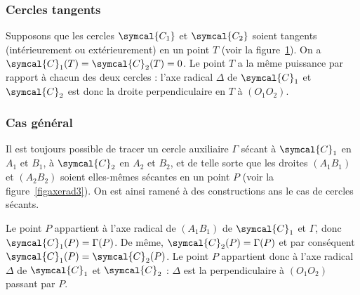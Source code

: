 \subsubsection{Cercles tangents}
Supposons que les cercles $\symcal{C_1}$ et $\symcal{C_2}$ soient tangents (intérieurement ou extérieurement) en un point $T$ (voir la figure~\ref{figaxerad2}). On a 
$\symcal{C}_1(T)=\symcal{C}_2(T)=0$.
Le point $T$ a la même puissance par rapport à chacun des deux cercles : l'axe radical $\Delta$ de $\symcal{C}_1$ et $\symcal{C}_2$ est donc la droite perpendiculaire en $T$ à $(O_1O_2)$.

\begin{figure}[ht]
\centering
{}
\figcaption{}\label{figaxerad2}
\end{figure}


\subsubsection{Cas général}
Il est toujours possible de tracer un cercle auxiliaire $\Gamma$ sécant à $\symcal{C}_1$ en $A_1$ et $B_1$, à $\symcal{C}_2$ en $A_2$ et $B_2$, et  de telle sorte que les droites $(A_1B_1)$ et $(A_2B_2)$ soient elles-mêmes sécantes en un point $P$ (voir la figure~\ref{figaxerad3}). On est ainsi ramené à des constructions ans le cas de cercles sécants.

Le point $P$ appartient à l'axe radical de $(A_1B_1)$ de $\symcal{C}_1$ et $\Gamma$, donc $\symcal{C}_1(P)=\Gamma(P)$. De même, $\symcal{C}_2(P)=\Gamma(P)$ et par conséquent $\symcal{C}_1(P)=\symcal{C}_2(P)$. Le point $P$ appartient donc à l'axe radical $\Delta$ de $\symcal{C}_1$ et $\symcal{C}_2$ : $\Delta$  est  la perpendiculaire à $(O_1O_2)$ passant par $P$. 

